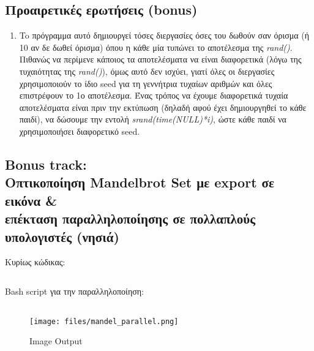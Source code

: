 \documentclass[a4paper,10pt]{article} \usepackage{anysize}
\begin{document}
\subsection{Προαιρετικές ερωτήσεις (bonus)} 

\begin{enumerate}

	\item To πρόγραμμα αυτό δημιουργεί τόσες διεργασίες όσες του δωθούν σαν
		όρισμα (ή 10 αν δε δωθεί όρισμα) όπου η κάθε μία τυπώνει το αποτέλεσμα
		της \emph{rand()}. Πιθανώς να περίμενε κάποιος τα αποτελέσματα να είναι
		διαφορετικά (λόγω της τυχαιότητας της \emph{rand()}), όμως αυτό δεν ισχύει,
		γιατί όλες οι διεργασίες χρησιμοποιούν το ίδιο seed για τη γεννήτρια
		τυχαίων αριθμών και όλες επιστρέφουν το 1ο αποτέλεσμα.  Ένας τρόπος να
		έχουμε διαφορετικά τυχαία αποτελέσματα είναι πριν την εκτύπωση (δηλαδή
		αφού έχει δημιουργηθεί το κάθε παιδί), να δώσουμε την εντολή
		\emph{srand(time(NULL)*i)}, ώστε κάθε παιδί να χρησιμοποιήσει
		διαφορετικό seed.   
\end{enumerate}

\subsection{Bonus track: \\Οπτικοποίηση Mandelbrot Set με export σε εικόνα \&
\\επέκταση παραλληλοποίησης σε πολλαπλούς υπολογιστές (νησιά)}
\noindent Κυρίως κώδικας:

\inputminted[linenos,fontsize=\footnotesize,frame=leftline]{c}{files/mandel_parallel.c}

\noindent Bash script για την παραλληλοποίηση:

\inputminted[linenos,fontsize=\footnotesize,frame=leftline]{bash}{files/runem.sh}
\begin{figure}[H]
	\centering
	\texttt{[image: files/mandel\_parallel.png]}
	\caption{Image Output}
\end{figure}
\end{document}
